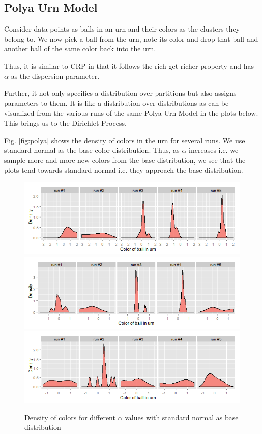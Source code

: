 \documentclass{article} %
\begin{document}
\subsection{Polya Urn Model}
Consider data points as balls in an urn and their colors as the clusters they belong to. We now pick a ball from the urn, note its color and drop that ball and another ball of the same color back into the urn.

Thus, it is similar to CRP in that it follows the rich-get-richer property and has $\alpha$ as the dispersion parameter.

Further, it not only specifies a distribution over partitions but also assigns parameters to them. It is like a distribution over distributions as can be visualized from the various runs of the same Polya Urn Model in the plots below. This brings us to the Dirichlet Process.

Fig. \ref{fig:polya} shows the density of colors in the urn for several runs. We use standard normal as the base color distribution. Thus, as $\alpha$ increases i.e. we sample more and more new colors from the base distribution, we see that the plots tend towards standard normal i.e. they approach the base distribution.
\begin{figure}
  \centering
  \caption{Density of colors for different $\alpha$ values with standard normal as base distribution}
\label{fig:polya}
  \includegraphics[width=.5\linewidth]{plots/polya-urn-1.png}
  \label{fig:polya1}
  \includegraphics[width=.5\linewidth]{plots/polya-urn-5.png}
  \label{fig:polya5}
  \includegraphics[width=.5\linewidth]{plots/polya-urn-50.png}
  \label{fig:polya50}
\end{figure}
\
\end{document}
